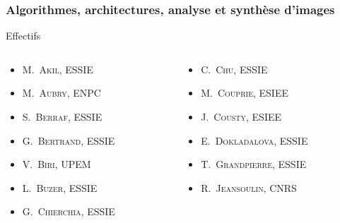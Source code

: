 \documentclass[]{beamer}
\begin{document}
\begin{frame}
  \frametitle{Algorithmes, architectures, analyse et synthèse d’images}

  \begin{block}{Effectifs}
    \begin{overprint}
      \begin{columns}
        \begin{column}{0.5\textwidth}
          \begin{itemize}
            \item \textsc{M.~Akil}, ESSIE
            \item \textsc{M.~Aubry}, ENPC
            \item \textsc{S.~Berraf}, ESSIE
            \item \textsc{G.~Bertrand}, ESSIE
            \item \textsc{V.~Biri}, UPEM
            \item \textsc{L.~Buzer}, ESSIE
            \item \textsc{G.~Chierchia}, ESSIE
          \end{itemize}
        \end{column}
        \begin{column}{0.5\textwidth}
          \begin{itemize}
            \item \textsc{C.~Chu}, ESSIE
            \item \textsc{M.~Couprie}, ESIEE
            \item \alert{\textsc{J.~Cousty}, ESIEE}
            \item \textsc{E.~Dokladalova}, ESSIE
            \item \textsc{T.~Grandpierre}, ESSIE
            \item \textsc{R.~Jeansoulin}, CNRS
          \end{itemize}
        \end{column}
      \end{columns}


\end{overprint}
\end{block}
\end{frame}
\end{document}
